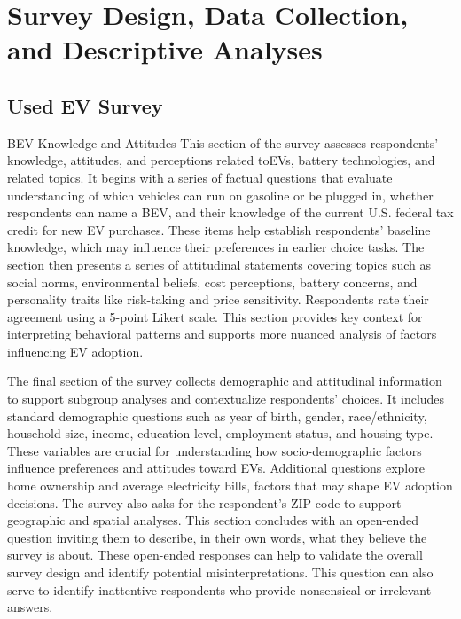 \documentclass[a4paper,fleqn]{cas-sc}   %
\begin{document}
\section{Survey Design, Data Collection, and Descriptive Analyses}

\subsection{Used EV Survey}



BEV Knowledge and Attitudes
This section of the survey assesses respondents' knowledge, attitudes, and perceptions related toEVs, battery technologies, and related topics. It begins with a series of factual questions that evaluate understanding of which vehicles can run on gasoline or be plugged in, whether respondents can name a BEV, and their knowledge of the current U.S. federal tax credit for new EV purchases. These items help establish respondents' baseline knowledge, which may influence their preferences in earlier choice tasks. The section then presents a series of attitudinal statements covering topics such as social norms, environmental beliefs, cost perceptions, battery concerns, and personality traits like risk-taking and price sensitivity. Respondents rate their agreement using a 5-point Likert scale. This section provides key context for interpreting behavioral patterns and supports more nuanced analysis of factors influencing EV adoption.


The final section of the survey collects demographic and attitudinal information to support subgroup analyses and contextualize respondents' choices. It includes standard demographic questions such as year of birth, gender, race/ethnicity, household size, income, education level, employment status, and housing type. These variables are crucial for understanding how socio-demographic factors influence preferences and attitudes toward EVs. Additional questions explore home ownership and average electricity bills, factors that may shape EV adoption decisions. The survey also asks for the respondent's ZIP code to support geographic and spatial analyses. This section concludes with an open-ended question inviting them to describe, in their own words, what they believe the survey is about. These open-ended responses can help to validate the overall survey design and identify potential misinterpretations. This question can also serve to identify inattentive respondents who provide nonsensical or irrelevant answers.
\end{document}
